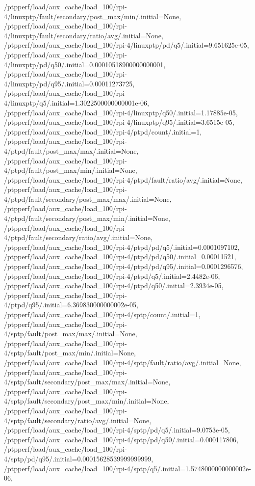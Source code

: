 {    /ptpperf/load/aux_cache/load_100/rpi-4/linuxptp/fault/secondary/post_max/min/.initial=None,
    /ptpperf/load/aux_cache/load_100/rpi-4/linuxptp/fault/secondary/ratio/avg/.initial=None,
    /ptpperf/load/aux_cache/load_100/rpi-4/linuxptp/pd/q5/.initial=9.651625e-05,
    /ptpperf/load/aux_cache/load_100/rpi-4/linuxptp/pd/q50/.initial=0.00010518900000000001,
    /ptpperf/load/aux_cache/load_100/rpi-4/linuxptp/pd/q95/.initial=0.00011273725,
    /ptpperf/load/aux_cache/load_100/rpi-4/linuxptp/q5/.initial=1.3022500000000001e-06,
    /ptpperf/load/aux_cache/load_100/rpi-4/linuxptp/q50/.initial=1.17885e-05,
    /ptpperf/load/aux_cache/load_100/rpi-4/linuxptp/q95/.initial=3.6515e-05,
    /ptpperf/load/aux_cache/load_100/rpi-4/ptpd/count/.initial=1,
    /ptpperf/load/aux_cache/load_100/rpi-4/ptpd/fault/post_max/max/.initial=None,
    /ptpperf/load/aux_cache/load_100/rpi-4/ptpd/fault/post_max/min/.initial=None,
    /ptpperf/load/aux_cache/load_100/rpi-4/ptpd/fault/ratio/avg/.initial=None,
    /ptpperf/load/aux_cache/load_100/rpi-4/ptpd/fault/secondary/post_max/max/.initial=None,
    /ptpperf/load/aux_cache/load_100/rpi-4/ptpd/fault/secondary/post_max/min/.initial=None,
    /ptpperf/load/aux_cache/load_100/rpi-4/ptpd/fault/secondary/ratio/avg/.initial=None,
    /ptpperf/load/aux_cache/load_100/rpi-4/ptpd/pd/q5/.initial=0.0001097102,
    /ptpperf/load/aux_cache/load_100/rpi-4/ptpd/pd/q50/.initial=0.00011521,
    /ptpperf/load/aux_cache/load_100/rpi-4/ptpd/pd/q95/.initial=0.0001296576,
    /ptpperf/load/aux_cache/load_100/rpi-4/ptpd/q5/.initial=2.4482e-06,
    /ptpperf/load/aux_cache/load_100/rpi-4/ptpd/q50/.initial=2.3934e-05,
    /ptpperf/load/aux_cache/load_100/rpi-4/ptpd/q95/.initial=6.369830000000002e-05,
    /ptpperf/load/aux_cache/load_100/rpi-4/sptp/count/.initial=1,
    /ptpperf/load/aux_cache/load_100/rpi-4/sptp/fault/post_max/max/.initial=None,
    /ptpperf/load/aux_cache/load_100/rpi-4/sptp/fault/post_max/min/.initial=None,
    /ptpperf/load/aux_cache/load_100/rpi-4/sptp/fault/ratio/avg/.initial=None,
    /ptpperf/load/aux_cache/load_100/rpi-4/sptp/fault/secondary/post_max/max/.initial=None,
    /ptpperf/load/aux_cache/load_100/rpi-4/sptp/fault/secondary/post_max/min/.initial=None,
    /ptpperf/load/aux_cache/load_100/rpi-4/sptp/fault/secondary/ratio/avg/.initial=None,
    /ptpperf/load/aux_cache/load_100/rpi-4/sptp/pd/q5/.initial=9.0753e-05,
    /ptpperf/load/aux_cache/load_100/rpi-4/sptp/pd/q50/.initial=0.000117806,
    /ptpperf/load/aux_cache/load_100/rpi-4/sptp/pd/q95/.initial=0.00015628539999999999,
    /ptpperf/load/aux_cache/load_100/rpi-4/sptp/q5/.initial=1.5748000000000002e-06,
}
